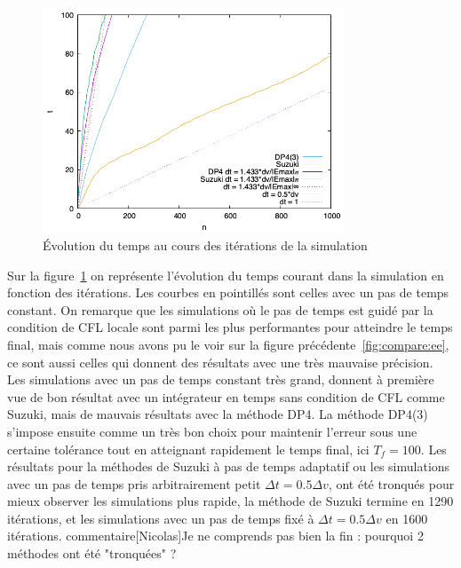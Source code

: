\begin{figure}[h]
  \centering
  \includegraphics[width=0.8\textwidth]{img/compare_time_dtt}
  \caption{Évolution du temps au cours des itérations de la simulation}
  \label{fig:compare:time:dtt}
\end{figure}

Sur la figure~\ref{fig:compare:time:dtt} on représente l'évolution du temps courant dans la simulation en fonction des itérations. Les courbes en pointillés sont celles avec un pas de temps constant. On remarque que les simulations où le pas de temps est guidé par la condition de CFL locale sont parmi les plus performantes pour atteindre le temps final, mais comme nous avons pu le voir sur la figure précédente~\ref{fig:compare:ee}, ce sont aussi celles qui donnent des résultats avec une très mauvaise précision. Les simulations avec un pas de temps constant très grand, donnent à première vue de bon résultat avec un intégrateur en temps sans condition de CFL comme Suzuki, mais de mauvais résultats avec la méthode DP4. La méthode DP4(3) s'impose ensuite comme un très bon choix pour maintenir l'erreur sous une certaine tolérance tout en atteignant rapidement le temps final, ici $T_f=100$. Les résultats pour la méthodes de Suzuki à pas de temps adaptatif ou les simulations avec un pas de temps pris arbitrairement petit $\Delta t = 0.5\Delta v$, ont été tronqués pour mieux observer les simulations plus rapide, la méthode de Suzuki termine en 1290 itérations, et les simulations avec un pas de temps fixé à $\Delta t = 0.5\Delta v$ en 1600 itérations.
commentaire[Nicolas]{Je ne comprends pas bien la fin : pourquoi 2 m\'ethodes ont \'et\'e "tronqu\'ees" ? }

